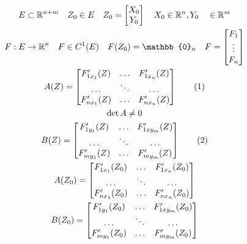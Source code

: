 \documentclass[main]{subfiles}
\begin{document}
      \begin{gather*}
         E \subset {\vR}^{n+m} \quad Z_0 \in E \quad Z_0 = \begin{bmatrix*}
            X_0 \\
            Y_0
         \end{bmatrix*} \quad X_0 \in {\vR}^n, Y_0 \quad \in {\vR}^m \\
         F: E \rightarrow {\vR}^n \quad F \in C^1(E) \quad F(Z_0) = \mathbb{0}_n \quad
         F = \begin{bmatrix*}
            F_1 \\
            \vdots \\
            F_n
         \end{bmatrix*} \\
         A(Z) = \begin{bmatrix*}
            F^\prime_{1x_1}(Z) & \ldots & F^\prime_{1x_n}(Z) \\
            \ldots & \ddots & \ldots \\
            F^\prime_{nx_1}(Z) & \ldots & F^\prime_{nx_n}(Z)
         \end{bmatrix*} \tag{1} \\
         \det A \ne 0  \\
         B(Z) = \begin{bmatrix*}
            F^\prime_{1y_1}(Z) & \ldots & F^\prime_{1xy_m}(Z) \\
            \ldots & \ddots & \ldots \\
            F^\prime_{my_1}(Z) & \ldots & F^\prime_{my_m}(Z)
         \end{bmatrix*}  \tag{2}\\
         A(Z_0) = \begin{bmatrix*}
            F^\prime_{1x_1}(Z_0) & \ldots & F^\prime_{1x_n}(Z_0) \\
            \ldots & \ddots & \ldots \\
            F^\prime_{nx_1}(Z_0) & \ldots & F^\prime_{nx_n}(Z_0)
         \end{bmatrix*} \\
         B(Z_0) = \begin{bmatrix*}
            F^\prime_{1y_1}(Z_0) & \ldots & F^\prime_{1xy_m}(Z_0) \\
            \ldots & \ddots & \ldots \\
            F^\prime_{my_1}(Z_0) & \ldots & F^\prime_{my_m}(Z_0)
         \end{bmatrix*} \\

\end{gather*}
\end{document}
